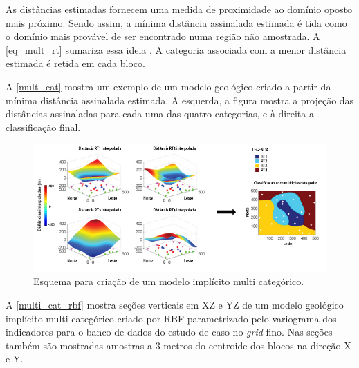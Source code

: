 As distâncias estimadas fornecem uma medida de proximidade ao domínio oposto mais próximo. Sendo assim, a mínima distância assinalada estimada é tida como o domínio mais provável de ser encontrado numa região não amostrada. A \autoref{eq_mult_rt} sumariza essa ideia \cite{silvaenhancedgeomodeling}. A categoria associada com a menor distância estimada é retida em cada bloco.

A \autoref{mult_cat} mostra um exemplo de um modelo geológico criado a partir da mínima distância assinalada estimada. A esquerda, a figura mostra a projeção das distâncias assinaladas para cada uma das quatro categorias, e à direita a classificação final.

\begin{figure}[H]
    \caption{\label{mult_cat}Esquema para criação de um modelo implícito multi categórico.}
	\begin{center}
		\includegraphics[width=\textwidth]{capitulo_2/mult_cat_legenda.jpg}
	\end{center}
\end{figure}

A \autoref{multi_cat_rbf} mostra seções verticais em XZ e YZ de um modelo geológico implícito multi categórico criado por RBF parametrizado pelo variograma dos indicadores para o banco de dados do estudo de caso no \textit{grid} fino. Nas seções também são mostradas amostras a 3 metros do centroide dos blocos na direção X e Y.


